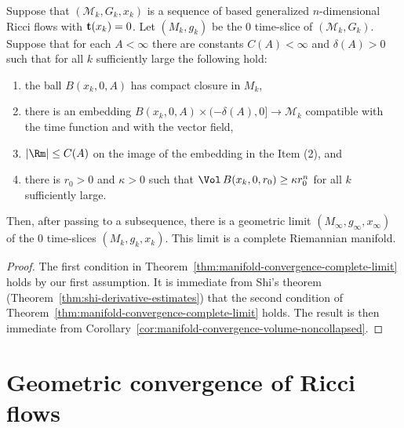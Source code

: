 \begin{theorem}\label{thm:ricci-flow-slice-convergence}
\label{sliceconv}

Suppose that $({\mathcal M}_k,G_k,x_k)$ is a sequence of based
generalized $n$-dimensional Ricci flows with ${\bf t}(x_k)=0$. Let
$(M_k,g_k)$ be the $0$ time-slice of $({\mathcal M}_k,G_k)$. Suppose
that for each $A<\infty$ there are constants $C(A)<\infty$ and
$\delta(A)>0$ such that for all $k$ sufficiently large the following
hold:
\begin{enumerate}
\item[(1)] the ball $B(x_k,0,A)$ has compact closure in $M_k$,
\item[(2)] there is an embedding $B(x_k,0,A)\times (-\delta(A),0]\to {\mathcal M}_k$ compatible with
the time function and with the vector field, \item[(3)]   $|\Rm|\le C(A)$
on the image of the embedding in the Item (2), and \item[(4)] there is $r_0>0$
and $\kappa>0$ such that $\Vol\,B(x_k,0,r_0)\ge \kappa r_0^n$ for all $k$
sufficiently large.
\end{enumerate} Then, after passing to a
subsequence, there is a geometric limit
$(M_\infty,g_\infty,x_\infty)$ of the $0$ time-slices
$(M_k,g_k,x_k)$. This limit is a complete Riemannian manifold.
\end{theorem}


\begin{proof}
\sketch
{}
The first condition in Theorem~\ref{thm:manifold-convergence-complete-limit} holds by our first
assumption. It is immediate from Shi's theorem (Theorem~\ref{thm:shi-derivative-estimates})
that the second condition of Theorem~\ref{thm:manifold-convergence-complete-limit} holds. The result
is then immediate from Corollary~\ref{cor:manifold-convergence-volume-noncollapsed}.
\end{proof}


\section{Geometric convergence of Ricci flows}




